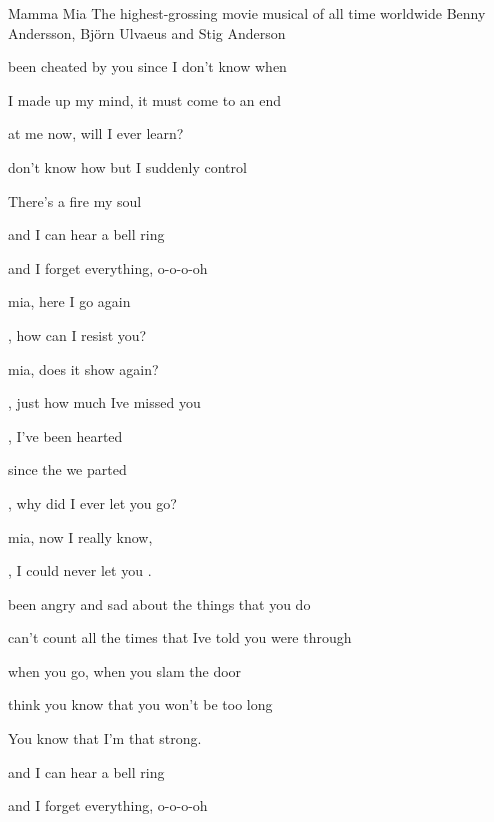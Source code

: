 \begin{SBSong}{Mamma Mia}
  {The highest-grossing movie musical of all time worldwide}
  {Benny Andersson, Bj\"orn Ulvaeus and Stig Anderson}
  \begin{SBVerse}
     been cheated by you since I don't know  when
    
     I made up my mind, it must come to an  end
    
     at me now, will I ever learn?
    
     don't know how but I suddenly  control

    There's a fire  my soul
    
       and I can hear a bell ring
    
       and I forget everything, o-o-o-oh
  \end{SBVerse}
  \begin{SBChorus}
     mia, here I go again

    , how can I resist you?

     mia, does it show again?

    , just how much Ive missed you

    , I've been  hearted

     since the  we parted

    , why did I ever let you go?

     mia, now I really know,

    , I could never let you .
  \end{SBChorus}
  \begin{SBVerse}
     been angry and sad about the things that you  do

     can't count all the times that Ive told you were  through

     when you go, when you slam the door
    
     think you know that you won't be  too long

    You know that I'm  that strong.
    
       and I can hear a bell ring
    
       and I forget everything, o-o-o-oh
  \end{SBVerse}
\end{SBSong}
